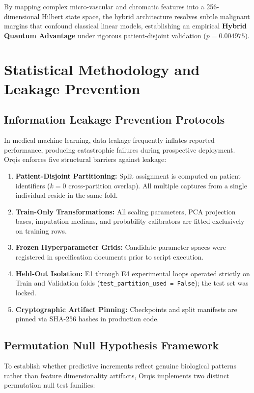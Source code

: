 \documentclass[11pt,a4paper]{report}
\begin{document}
By mapping complex micro-vascular and chromatic features into a 256-dimensional Hilbert state space, the hybrid architecture resolves subtle malignant margins that confound classical linear models, establishing an empirical \textbf{Hybrid Quantum Advantage} under rigorous patient-disjoint validation ($p = 0.004975$).

\chapter{Statistical Methodology and Leakage Prevention}

\section{Information Leakage Prevention Protocols}
In medical machine learning, data leakage frequently inflates reported performance, producing catastrophic failures during prospective deployment. Orqis enforces five structural barriers against leakage:
\begin{enumerate}
  \item \textbf{Patient-Disjoint Partitioning:} Split assignment is computed on patient identifiers ($k=0$ cross-partition overlap). All multiple captures from a single individual reside in the same fold.
  \item \textbf{Train-Only Transformations:} All scaling parameters, PCA projection bases, imputation medians, and probability calibrators are fitted exclusively on training rows.
  \item \textbf{Frozen Hyperparameter Grids:} Candidate parameter spaces were registered in specification documents prior to script execution.
  \item \textbf{Held-Out Isolation:} E1 through E4 experimental loops operated strictly on Train and Validation folds (\texttt{test\_partition\_used = False}); the test set was locked.
  \item \textbf{Cryptographic Artifact Pinning:} Checkpoints and split manifests are pinned via SHA-256 hashes in production code.
\end{enumerate}

\section{Permutation Null Hypothesis Framework}
To establish whether predictive increments reflect genuine biological patterns rather than feature dimensionality artifacts, Orqis implements two distinct permutation null test families:
\end{document}

